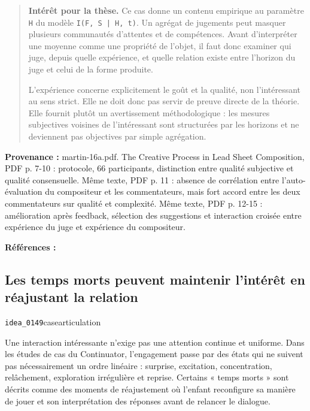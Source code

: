 \documentclass[10pt,a4paper]{article}
\begin{document}
\begin{quote}
\textbf{Intérêt pour la thèse.} Ce cas donne un contenu empirique au paramètre \texttt{H} du modèle \texttt{I(F, S | H, t)}. Un agrégat de jugements peut masquer plusieurs communautés d'attentes et de compétences. Avant d'interpréter une moyenne comme une propriété de l'objet, il faut donc examiner qui juge, depuis quelle expérience, et quelle relation existe entre l'horizon du juge et celui de la forme produite.

L'expérience concerne explicitement le goût et la qualité, non l'intéressant au sens strict. Elle ne doit donc pas servir de preuve directe de la théorie. Elle fournit plutôt un avertissement méthodologique : les mesures subjectives voisines de l'intéressant sont structurées par les horizons et ne deviennent pas objectives par simple agrégation.
\end{quote}
{\footnotesize\color{metadata}\textbf{Provenance :} martin-16a.pdf. The Creative Process in Lead Sheet Composition, PDF p. 7-10 : protocole, 66 participants, distinction entre qualité subjective et qualité consensuelle. Même texte, PDF p. 11 : absence de corrélation entre l'auto-évaluation du compositeur et les commentateurs, mais fort accord entre les deux commentateurs sur qualité et complexité. Même texte, PDF p. 12-15 : amélioration après feedback, sélection des suggestions et interaction croisée entre expérience du juge et expérience du compositeur.\par}
{\footnotesize\color{metadata}\textbf{Références :} \parencite{martin2016creativeprocess}\par}

\subsection{Les temps morts peuvent maintenir l'intérêt en réajustant la relation}
{\small\color{metadata} \texttt{idea\_0149}\quad\textbullet\quad case\quad\textbullet\quad articulation\par}

Une interaction intéressante n'exige pas une attention continue et uniforme. Dans les études de cas du Continuator, l'engagement passe par des états qui ne suivent pas nécessairement un ordre linéaire : surprise, excitation, concentration, relâchement, exploration irrégulière et reprise. Certains « temps morts » sont décrits comme des moments de réajustement où l'enfant reconfigure sa manière de jouer et son interprétation des réponses avant de relancer le dialogue.
\end{document}
